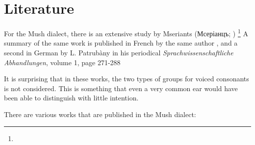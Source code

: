 \section{Literature}

For the Mush dialect, there is an extensive study by Mseriants (Мсеріанцъ; ) \citep{Mseriants-1897-Part1,Mseriants-1901-Part2}\footnote{} A summary of the same work is published in French by the same author \citep{Mserianz-1899-Mush}, and a second in German by L. Patrubàny in his periodical \textit{Sprachwissenschaftliche Abhandlungen}, volume 1, page 271-288

It is surprising that in these works, the two types of groups for voiced consonants is not considered. This is something that even a very common ear  would have been able to distinguish with little intention.

There are various works that are published in the Mush dialect: 

{\litoverview}


